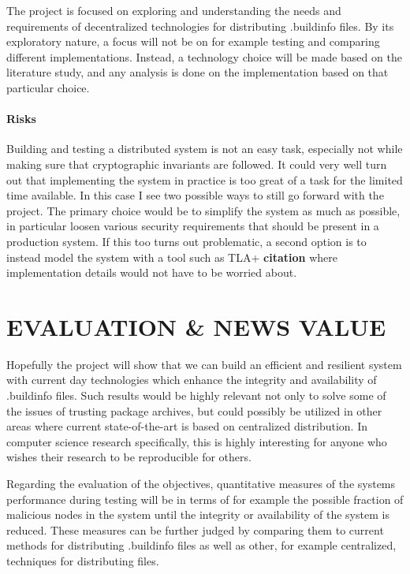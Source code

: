 \documentclass{article}
\begin{document}
The project is focused on exploring and understanding the needs and requirements of decentralized technologies for distributing .buildinfo files. By its exploratory nature, a focus will not be on for example testing and comparing different implementations. Instead, a technology choice will be made based on the literature study, and any analysis is done on the implementation based on that particular choice.

\paragraph{Risks}
Building and testing a distributed system is not an easy task, especially not while making sure that cryptographic invariants are followed. It could very well turn out that implementing the system in practice is too great of a task for the limited time available. In this case I see two possible ways to still go forward with the project. The primary choice would be to simplify the system as much as possible, in particular loosen various security requirements that should be present in a production system. If this too turns out problematic, a second option is to instead model the system with a tool such as TLA+ \textbf{citation} where implementation details would not have to be worried about. 

\section*{EVALUATION \& NEWS VALUE}

Hopefully the project will show that we can build an efficient and resilient system with current day technologies which enhance the integrity and availability of .buildinfo files. Such results would be highly relevant not only to solve some of the issues of trusting package archives, but could possibly be utilized in other areas where current state-of-the-art is based on centralized distribution. In computer science research specifically, this is highly interesting for anyone who wishes their research to be reproducible for others.

Regarding the evaluation of the objectives, quantitative measures of the systems performance during testing will be in terms of for example the possible fraction of malicious nodes in the system until the integrity or availability of the system is reduced. These measures can be further judged by comparing them to current methods for distributing .buildinfo files as well as other, for example centralized, techniques for distributing files. 
\end{document}

